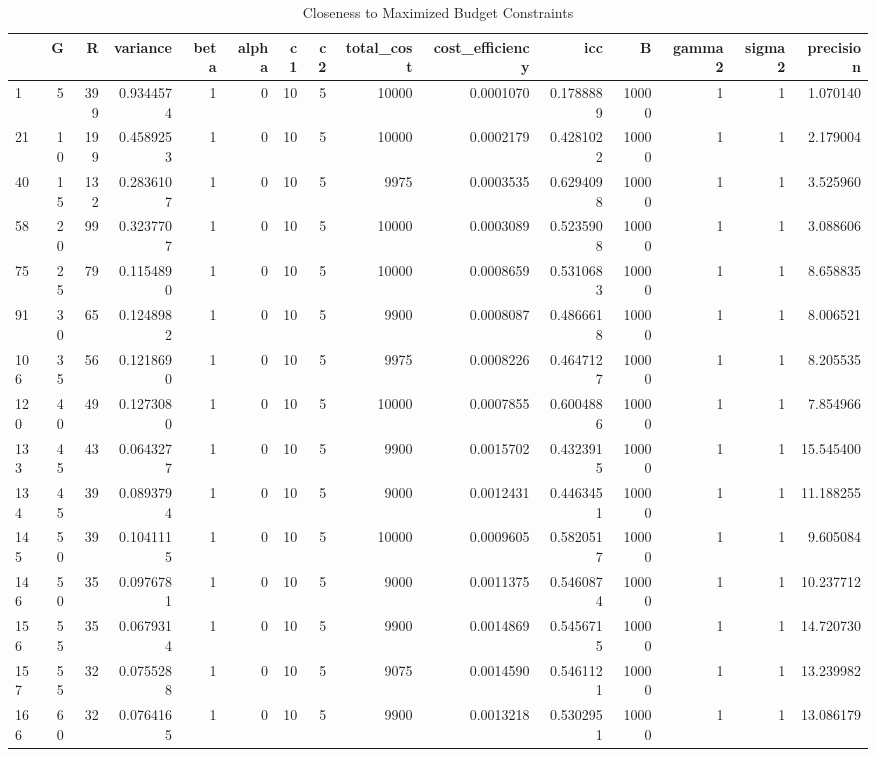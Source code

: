 \documentclass[
]{article}
\begin{document}
\begin{table}
\centering
\caption{\label{tab:unnamed-chunk-4}Closeness to Maximized Budget Constraints}
\centering
\begin{tabular}[t]{l|r|r|r|r|r|r|r|r|r|r|r|r|r|r}
\hline
  & G & R & variance & beta & alpha & c1 & c2 & total\_cost & cost\_efficiency & icc & B & gamma2 & sigma2 & precision\\
\hline
1 & 5 & 399 & 0.9344574 & 1 & 0 & 10 & 5 & 10000 & 0.0001070 & 0.1788889 & 10000 & 1 & 1 & 1.070140\\
\hline
21 & 10 & 199 & 0.4589253 & 1 & 0 & 10 & 5 & 10000 & 0.0002179 & 0.4281022 & 10000 & 1 & 1 & 2.179004\\
\hline
40 & 15 & 132 & 0.2836107 & 1 & 0 & 10 & 5 & 9975 & 0.0003535 & 0.6294098 & 10000 & 1 & 1 & 3.525960\\
\hline
58 & 20 & 99 & 0.3237707 & 1 & 0 & 10 & 5 & 10000 & 0.0003089 & 0.5235908 & 10000 & 1 & 1 & 3.088606\\
\hline
75 & 25 & 79 & 0.1154890 & 1 & 0 & 10 & 5 & 10000 & 0.0008659 & 0.5310683 & 10000 & 1 & 1 & 8.658835\\
\hline
91 & 30 & 65 & 0.1248982 & 1 & 0 & 10 & 5 & 9900 & 0.0008087 & 0.4866618 & 10000 & 1 & 1 & 8.006521\\
\hline
106 & 35 & 56 & 0.1218690 & 1 & 0 & 10 & 5 & 9975 & 0.0008226 & 0.4647127 & 10000 & 1 & 1 & 8.205535\\
\hline
120 & 40 & 49 & 0.1273080 & 1 & 0 & 10 & 5 & 10000 & 0.0007855 & 0.6004886 & 10000 & 1 & 1 & 7.854966\\
\hline
133 & 45 & 43 & 0.0643277 & 1 & 0 & 10 & 5 & 9900 & 0.0015702 & 0.4323915 & 10000 & 1 & 1 & 15.545400\\
\hline
134 & 45 & 39 & 0.0893794 & 1 & 0 & 10 & 5 & 9000 & 0.0012431 & 0.4463451 & 10000 & 1 & 1 & 11.188255\\
\hline
145 & 50 & 39 & 0.1041115 & 1 & 0 & 10 & 5 & 10000 & 0.0009605 & 0.5820517 & 10000 & 1 & 1 & 9.605084\\
\hline
146 & 50 & 35 & 0.0976781 & 1 & 0 & 10 & 5 & 9000 & 0.0011375 & 0.5460874 & 10000 & 1 & 1 & 10.237712\\
\hline
156 & 55 & 35 & 0.0679314 & 1 & 0 & 10 & 5 & 9900 & 0.0014869 & 0.5456715 & 10000 & 1 & 1 & 14.720730\\
\hline
157 & 55 & 32 & 0.0755288 & 1 & 0 & 10 & 5 & 9075 & 0.0014590 & 0.5461121 & 10000 & 1 & 1 & 13.239982\\
\hline
166 & 60 & 32 & 0.0764165 & 1 & 0 & 10 & 5 & 9900 & 0.0013218 & 0.5302951 & 10000 & 1 & 1 & 13.086179\\

\end{tabular}
\end{table}
\end{document}
